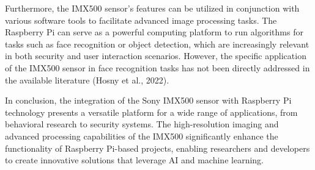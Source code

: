 \documentclass[12pt]{article}
\begin{document}
Furthermore, the IMX500 sensor's features can be utilized in 
conjunction with various software tools to facilitate advanced 
image processing tasks. The Raspberry Pi can serve as a 
powerful computing platform to run algorithms for tasks 
such as face recognition or object detection, which are 
increasingly relevant in both security and user interaction 
scenarios. However, the specific application of the IMX500 
sensor in face recognition tasks has not been directly 
addressed in the available literature (Hosny et al., 2022).

In conclusion, the integration of the Sony IMX500 sensor 
with Raspberry Pi technology presents a versatile platform 
for a wide range of applications, from behavioral research 
to security systems. The high-resolution imaging and advanced 
processing capabilities of the IMX500 significantly enhance the 
functionality of Raspberry Pi-based projects, enabling 
researchers and developers to create innovative solutions 
that leverage AI and machine learning.
\end{document}
